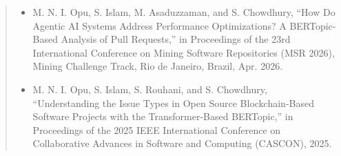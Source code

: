 \begin{quote}
\begin{itemize}
    \item M. N. I. Opu, S. Islam, M. Asaduzzaman, and S. Chowdhury, “How Do Agentic AI Systems Address Performance Optimizations? A BERTopic-Based Analysis of Pull Requests,” in Proceedings of the 23rd International Conference on Mining Software Repositories (MSR 2026), Mining Challenge Track, Rio de Janeiro, Brazil, Apr. 2026.
    \item M. N. I. Opu, S. Islam, S. Rouhani, and S. Chowdhury, “Understanding the Issue Types in Open Source Blockchain-Based Software Projects with the Transformer-Based BERTopic,” in Proceedings of the 2025 IEEE International Conference on Collaborative Advances in Software and Computing (CASCON), 2025.
    \end{itemize}
\end{quote}


